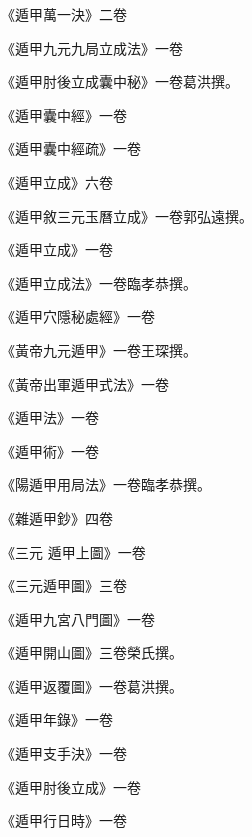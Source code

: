 \begin{pinyinscope}
 《遁甲萬一決》二卷



 《遁甲九元九局立成法》一卷



 《遁甲肘後立成囊中秘》一卷葛洪撰。



 《遁甲囊中經》一卷



 《遁甲囊中經疏》一卷



 《遁甲立成》六卷



 《遁甲敘三元玉曆立成》一卷郭弘遠撰。



 《遁甲立成》一卷



 《遁甲立成法》一卷臨孝恭撰。



 《遁甲穴隱秘處經》一卷



 《黃帝九元遁甲》一卷王琛撰。



 《黃帝出軍遁甲式法》一卷



 《遁甲法》一卷



 《遁甲術》一卷



 《陽遁甲用局法》一卷臨孝恭撰。



 《雜遁甲鈔》四卷



 《三元
 遁甲上圖》一卷



 《三元遁甲圖》三卷



 《遁甲九宮八門圖》一卷



 《遁甲開山圖》三卷榮氏撰。



 《遁甲返覆圖》一卷葛洪撰。



 《遁甲年錄》一卷



 《遁甲支手決》一卷



 《遁甲肘後立成》一卷



 《遁甲行日時》一卷




\end{pinyinscope}
